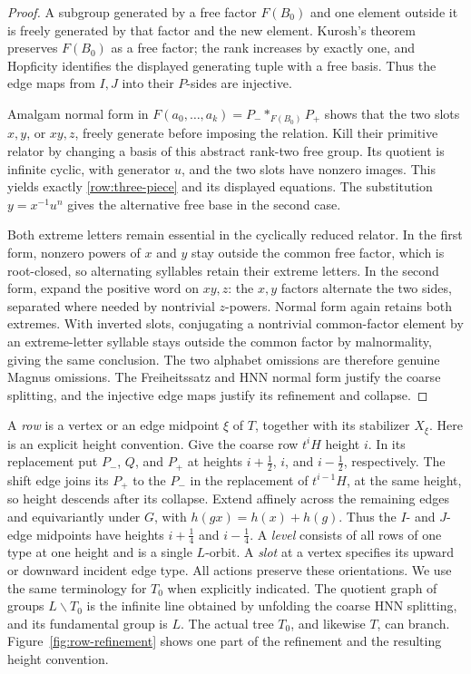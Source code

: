 \begin{proof}
A subgroup generated by a free factor \(F(B_0)\) and one element
outside it is freely generated by that factor and the new element.
Kurosh's theorem preserves \(F(B_0)\) as a free factor; the rank
increases by exactly one, and Hopficity identifies the displayed
generating tuple with a free basis. Thus the edge maps from \(I,J\)
into their \(P\)-sides are injective.

Amalgam normal form in
\(F(a_0,\ldots,a_k)=P_-*_{F(B_0)}P_+\) shows that the two slots
\(x,y\), or \(xy,z\), freely generate before imposing the relation.
Kill their primitive relator by changing a basis of this abstract
rank-two free group. Its quotient is infinite cyclic, with generator
\(u\), and the two slots have nonzero images. This yields exactly
\eqref{row:three-piece} and its displayed equations. The substitution
\(y=x^{-1}u^n\) gives the alternative free base in the second case.

Both extreme letters remain essential in the cyclically reduced
relator. In the first form, nonzero powers of \(x\) and \(y\) stay
outside the common free factor, which is root-closed, so alternating
syllables retain their extreme letters. In the second form, expand
the positive word on \(xy,z\): the \(x,y\) factors alternate the two
sides, separated where needed by nontrivial \(z\)-powers. Normal form
again retains both extremes. With inverted slots, conjugating a
nontrivial common-factor element by an extreme-letter syllable stays
outside the common factor by malnormality, giving the same conclusion.
The two alphabet omissions are therefore genuine Magnus omissions.
The Freiheitssatz and HNN normal form justify the coarse splitting,
and the injective edge maps justify its refinement and collapse.
\end{proof}

A \emph{row} is a vertex or an edge midpoint \(\xi\) of \(T\), together
with its stabilizer \(X_\xi\). Here is an explicit height convention.
Give the coarse row \(t^iH\) height \(i\). In its replacement put
\(P_-\), \(Q\), and \(P_+\) at heights \(i+\tfrac12\), \(i\), and
\(i-\tfrac12\), respectively. The shift edge joins its \(P_+\) to
the \(P_-\) in the replacement of \(t^{i-1}H\), at the same height,
so height descends after its collapse.
Extend affinely across the remaining edges and equivariantly under
\(G\), with \(h(gx)=h(x)+h(g)\). Thus the \(I\)- and \(J\)-edge
midpoints have heights \(i+\tfrac14\) and \(i-\tfrac14\).
A \emph{level} consists of all rows of one type at one height and is
a single \(L\)-orbit. A \emph{slot} at a vertex specifies its upward
or downward incident edge type. All actions preserve these
orientations. We use the same terminology for \(T_0\) when explicitly
indicated. The quotient graph of groups \(L\backslash T_0\) is the
infinite line obtained by unfolding the coarse HNN splitting, and
its fundamental group is \(L\). The actual tree \(T_0\), and likewise
\(T\), can branch. Figure~\ref{fig:row-refinement} shows one part of
the refinement and the resulting height convention.


